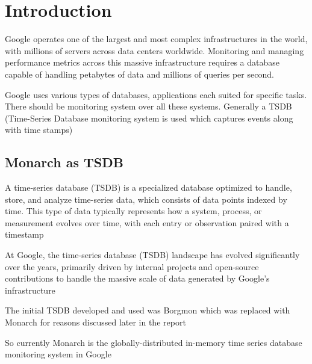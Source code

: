 



\section{Introduction}

Google operates one of the largest and most complex infrastructures in the world, with millions of servers across data centers worldwide. Monitoring and managing performance metrics across this massive infrastructure requires a database capable of handling petabytes of data and millions of queries per second.

Google uses various types of databases, applications each suited for specific tasks. There should be monitoring system over all these systems. Generally a TSDB (Time-Series Database monitoring system is used which captures events along with time stamps)


\subsection{Monarch as TSDB}

A time-series database (TSDB) is a specialized database optimized to handle, store, and analyze time-series data, which consists of data points indexed by time. This type of data typically represents how a system, process, or measurement evolves over time, with each entry or observation paired with a timestamp

At Google, the time-series database (TSDB) landscape has evolved significantly over the years, primarily driven by internal projects and open-source contributions to handle the massive scale of data generated by Google's infrastructure

The initial TSDB developed and used was Borgmon which was replaced with Monarch for reasons discussed later in the report

So currently Monarch is the globally-distributed in-memory time series database monitoring system in Google
